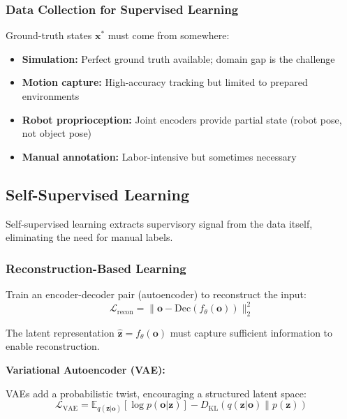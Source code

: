 \subsubsection{Data Collection for Supervised Learning}

Ground-truth states $\mathbf{x}^*$ must come from somewhere:

\begin{itemize}
    \item \textbf{Simulation:} Perfect ground truth available; domain gap is the challenge
    \item \textbf{Motion capture:} High-accuracy tracking but limited to prepared environments
    \item \textbf{Robot proprioception:} Joint encoders provide partial state (robot pose, not object pose)
    \item \textbf{Manual annotation:} Labor-intensive but sometimes necessary
\end{itemize}


\subsection{Self-Supervised Learning}

Self-supervised learning extracts supervisory signal from the data itself, eliminating the need for manual labels.

\subsubsection{Reconstruction-Based Learning}

Train an encoder-decoder pair (autoencoder) to reconstruct the input:
\begin{equation}
\mathcal{L}_{\text{recon}} = \| \mathbf{o} - \text{Dec}(f_\theta(\mathbf{o})) \|_2^2
\label{eq:reconstruction_loss}
\end{equation}

The latent representation $\hat{\mathbf{z}} = f_\theta(\mathbf{o})$ must capture sufficient information to enable reconstruction.

\textbf{Variational Autoencoder (VAE):}

VAEs add a probabilistic twist, encouraging a structured latent space:
\begin{equation}
\mathcal{L}_{\text{VAE}} = \mathbb{E}_{q(\mathbf{z}|\mathbf{o})}[\log p(\mathbf{o}|\mathbf{z})] - D_{\text{KL}}(q(\mathbf{z}|\mathbf{o}) \| p(\mathbf{z}))
\label{eq:vae_loss}
\end{equation}


